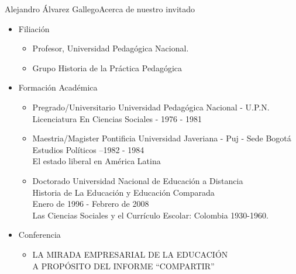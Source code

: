 \documentclass{beamer}
\begin{document}
\begin{frame}{Alejandro Álvarez Gallego}{Acerca de nuestro invitado}

  \begin{itemize}
  \item
    Filiación

    \begin{itemize}
    \item
      Profesor, Universidad Pedagógica Nacional.
    \item
      Grupo Historia de la Práctica Pedagógica
    \end{itemize}
  \item
    Formación Académica

    \begin{itemize}
    \item
      Pregrado/Universitario Universidad Pedagógica Nacional - U.P.N.\\
Licenciatura En Ciencias Sociales - 1976 - 1981
    \item
	Maestria/Magister Pontificia Universidad Javeriana - Puj - Sede Bogotá\\
Estudios Políticos --1982 - 1984\\
El estado liberal en América Latina
    \item
      Doctorado Universidad Nacional de Educación a Distancia\\
Historia de La Educación y Educación Comparada\\
Enero de 1996 - Febrero de 2008\\
Las Ciencias Sociales y el Currículo Escolar: Colombia 1930-1960.\\
    \end{itemize}
  \item
    Conferencia

    \begin{itemize}
    \item
      LA MIRADA EMPRESARIAL DE LA EDUCACIÓN\\
A PROPÓSITO DEL INFORME “COMPARTIR”
    \end{itemize}
  \end{itemize}  
\end{frame}
\end{document}
